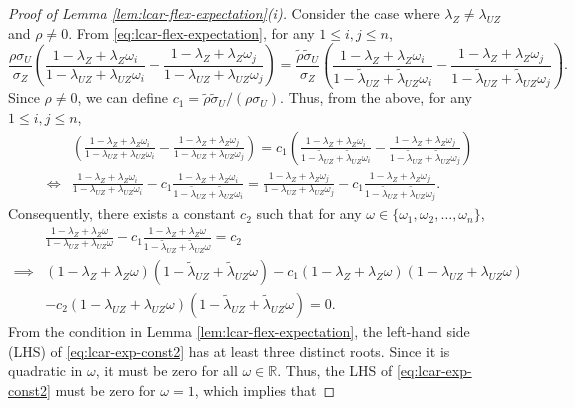 \documentclass[11pt]{article}
\theoremstyle{definition}
\theoremstyle{remark}
\begin{document}
\begin{proof}[Proof of Lemma \ref{lem:lcar-flex-expectation}(i)]
Consider the case where $\lambda_Z \neq \lambda_{UZ}$ and $\rho \neq 0$.
From \eqref{eq:lcar-flex-expectation}, for any $1\le i, j \le n$, 
\[\frac{\rho \sigma_U}{\sigma_Z}\left( \frac{1-\lambda_Z + \lambda_Z \omega_i}{1- \lambda_{UZ} + \lambda_{UZ} \omega_i} -  \frac{1-\lambda_Z + \lambda_Z \omega_j}{1- \lambda_{UZ} + \lambda_{UZ} \omega_j} \right) = \frac{\tilde\rho \tilde\sigma_U}{\sigma_Z}\left( \frac{1-\lambda_Z + \lambda_Z \omega_i}{1- \tilde\lambda_{UZ} + \tilde\lambda_{UZ} \omega_i} -  \frac{1-\lambda_Z + \lambda_Z \omega_j}{1- \tilde\lambda_{UZ} + \tilde\lambda_{UZ} \omega_j} \right).\]
Since $\rho \neq 0$, we can define $c_1 = \tilde{\rho}\tilde{\sigma}_U / (\rho \sigma_U)$. Thus, from the above, for any $1 \le i,j \le n$, 
\begin{align*}&\left( \frac{1-\lambda_Z + \lambda_Z \omega_i}{1- \lambda_{UZ} + \lambda_{UZ} \omega_i} -  \frac{1-\lambda_Z + \lambda_Z \omega_j}{1- \lambda_{UZ} + \lambda_{UZ} \omega_j} \right) = c_1\left( \frac{1-\lambda_Z + \lambda_Z \omega_i}{1- \tilde\lambda_{UZ} + \tilde\lambda_{UZ} \omega_i} -  \frac{1-\lambda_Z + \lambda_Z \omega_j}{1- \tilde\lambda_{UZ} + \tilde\lambda_{UZ} \omega_j} \right)\\
\iff & \frac{1-\lambda_Z + \lambda_Z \omega_i}{1- \lambda_{UZ} + \lambda_{UZ} \omega_i} - c_1  \frac{1-\lambda_Z + \lambda_Z \omega_i}{1- \tilde\lambda_{UZ} + \tilde\lambda_{UZ} \omega_i} = \frac{1-\lambda_Z + \lambda_Z \omega_j}{1- \lambda_{UZ} + \lambda_{UZ} \omega_j}  -  c_1\frac{1-\lambda_Z + \lambda_Z \omega_j}{1- \tilde\lambda_{UZ} + \tilde\lambda_{UZ} \omega_j} .
\end{align*}
Consequently, there exists a constant $c_2$ such that for any $\omega \in \{\omega_1, \omega_2,\ldots, \omega_n\}$,
\begin{align}
&\frac{1-\lambda_Z + \lambda_Z \omega}{1- \lambda_{UZ} + \lambda_{UZ} \omega} - c_1  \frac{1-\lambda_Z + \lambda_Z \omega}{1- \tilde\lambda_{UZ} + \tilde\lambda_{UZ} \omega} = c_2 \label{eq:lcar-exp-const1} \\
\implies &(1-\lambda_Z+\lambda_Z \omega)(1-\tilde{\lambda}_{UZ} + \tilde{\lambda}_{UZ}\omega) - c_1(1-\lambda_Z+\lambda_Z \omega)(1-{\lambda}_{UZ} + {\lambda}_{UZ}\omega) \nonumber\\
& -c_2(1-\lambda_{UZ}+\lambda_{UZ} \omega)(1-\tilde{\lambda}_{UZ} + \tilde{\lambda}_{UZ}\omega) =0. \label{eq:lcar-exp-const2}
\end{align}
From the condition in Lemma \ref{lem:lcar-flex-expectation}, the left-hand side (LHS) of \eqref{eq:lcar-exp-const2} has at least three distinct roots. Since it is quadratic in $\omega$, it must be zero for all $\omega \in \mathbb{R}$. Thus, the LHS  of \eqref{eq:lcar-exp-const2} must be zero for $\omega=1$, which implies that 

\end{proof}
\end{document}
